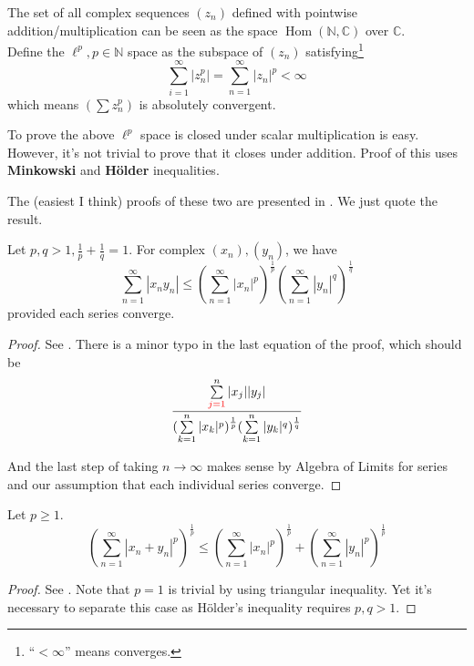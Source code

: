 \documentclass[10pt]{article}
\DeclareMathOperator{\Hom}{Hom}
\begin{document}
\begin{example}
  The set of all complex sequences $(z_n)$ defined with pointwise addition/multiplication can be seen as the space $\Hom(\mathbb{N}, \mathbb{C})$ over $\mathbb{C}$.\\

  Define the $\ell^p, p \in \mathbb{N}$ space as the subspace of $(z_n)$ satisfying\footnote{``$<\infty$'' means converges.}
  \begin{equation}
    \sum\limits_{i=1}^{\infty} |z_n^p| =  \sum\limits_{n=1}^{\infty} |z_n|^p < \infty
  \end{equation}
  which means $(\sum z_n^p)$ is absolutely convergent.
\end{example}

To prove the above $\ell^p$ space is closed under scalar multiplication is easy. However, it's not trivial to prove that it closes under addition. Proof of this uses \textbf{Minkowski} and \textbf{H\"older} inequalities.

The (easiest I think) proofs of these two are presented in \cite{intro-hilbert}. We just quote the result.

\begin{theorem}
  Let $p, q > 1, \frac{1}{p} + \frac{1}{q} = 1$. For complex $(x_n), (y_n)$, we have
  \begin{equation}
    \sum\limits_{n=1}^{\infty} |x_n y_n| \leq (\sum\limits_{n=1}^{\infty} |x_n|^p) ^{\frac{1}{p}} (\sum\limits_{n=1}^{\infty} |y_n|^q)^{\frac{1}{q}}
  \end{equation}
provided each series converge.
\end{theorem}
\begin{proof}
  See \cite[Theorem 1.2.7]{intro-hilbert}. There is a minor typo in the last equation of the proof, which should be
  \begin{equation}
    \frac{\sum\limits_{\begingroup\color{red}j=1\endgroup}^n |x_j||y_j|}{(\sum\limits_{k=1}^n |x_k|^p)^{\frac{1}{p}}(\sum\limits_{k=1}^n |y_k|^q)^{\frac{1}{q}}}
  \end{equation}

And the last step of taking $n\to \infty$ makes sense by Algebra of Limits for series and our assumption that each individual series converge.
\end{proof}

\begin{theorem}
  Let $p\geq 1$.
  \begin{equation}
    (\sum\limits_{n=1}^{\infty} |x_n + y_n|^p)^{\frac{1}{p}} \leq (\sum\limits_{n=1}^{\infty} |x_n|^p)^{\frac{1}{p}} + (\sum\limits_{n=1}^{\infty} |y_n|^p)^{\frac{1}{p}}
  \end{equation}
\end{theorem}
\begin{proof}
See \cite[Theorem 1.2.8]{intro-hilbert}. Note that $p=1$ is trivial by using triangular inequality. Yet it's necessary to separate this case as H\"older's inequality requires $p,q > 1$.
\end{proof}
\end{document}

